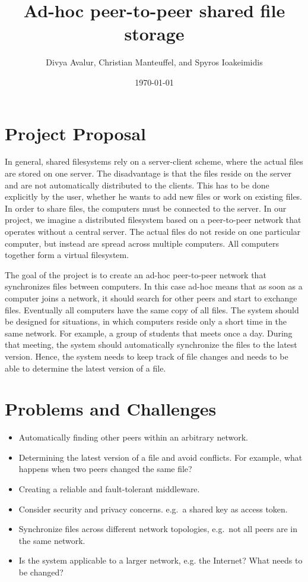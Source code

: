 \documentclass[a4paper, 11pt]{scrartcl}                %
\title{\Large Ad-hoc peer-to-peer shared file storage}
\author{\small Divya Avalur, Christian Manteuffel, and Spyros Ioakeimidis}
\date{\small \today}
\begin{document}
\maketitle

\thispagestyle{empty}

\section{Project Proposal}

In general, shared filesystems rely on a server-client scheme, where the actual files are stored on one server. 
The disadvantage is that the files reside on the server and are not automatically distributed to the clients. This has to be done explicitly by the user, whether he wants to add new files or work on existing files.
In order to share files, the computers must be connected to the server.
In our project, we imagine a distributed filesystem based on a peer-to-peer network that operates without a central server. 
The actual files do not reside on one particular computer, but instead are spread across multiple computers. All computers together form a virtual filesystem.

The goal of the project is to create an ad-hoc peer-to-peer network that synchronizes files between  computers. In this case ad-hoc means that as soon as a computer joins a network, it should search for other peers and start to exchange files. Eventually all computers have the same copy of all files. 
The system should be designed for situations, in which computers reside only a short time in the same network. For example, a group of students that meets once a day. During that meeting, the system should automatically synchronize the files to the latest version. 
Hence, the system needs to keep track of file changes and needs to be able to determine the latest version of a file. 

\section{Problems and Challenges}

\begin{itemize}
    \setlength{\itemsep}{0pt} \setlength{\parskip}{0pt}

	\item Automatically finding other peers within an arbitrary network.
	\item Determining the latest version of a file and avoid conflicts.  For example, what happens when two peers changed the same file?
	\item Creating a reliable and fault-tolerant middleware.
	\item Consider security and privacy concerns. e.g.\ a shared key as access token. 
	\item Synchronize files across different network topologies, e.g.\ not all peers are in the same network.
	 \item Is the system applicable to a larger network, e.g.  the Internet? What needs to be changed? 
\end{itemize}
\end{document}
